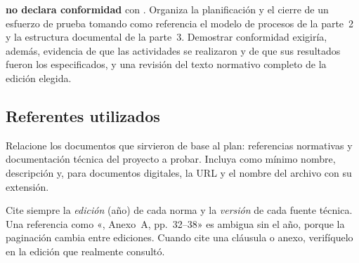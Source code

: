 \begin{notanormativa}
 \textbf{no declara conformidad} con \norma. Organiza
la planificación y el cierre de un esfuerzo de prueba tomando como referencia el modelo de
procesos de la parte~2 y la estructura documental de la parte~3. Demostrar conformidad exigiría,
además, evidencia de que las actividades se realizaron y de que sus resultados fueron los
especificados, y una revisión del texto normativo completo de la edición elegida.
\end{notanormativa}

\subsection{Referentes utilizados}

\begin{instruccion}
Relacione los documentos que sirvieron de base al plan: referencias normativas y documentación
técnica del proyecto a probar. Incluya como mínimo nombre, descripción y, para documentos
digitales, la URL y el nombre del archivo con su extensión.

Cite siempre la \emph{edición} (año) de cada norma y la \emph{versión} de cada fuente técnica.
Una referencia como «, Anexo~A, pp.~32--38» es ambigua sin el año, porque la
paginación cambia entre ediciones. Cuando cite una cláusula o anexo, verifíquelo en la edición
que realmente consultó.
\end{instruccion}

\begin{observacion}
\end{observacion}

